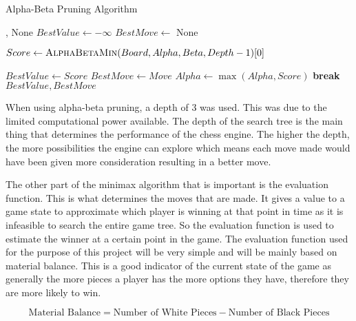 \begin{algorithm}[h]
    \caption{Alpha-Beta Pruning Algorithm}
    \begin{algorithmic}
            \State \Return {}, None
        \EndIf
        \State $BestValue \gets -\infty$
        \State $BestMove \gets$ None

            \State {}
            \State $Score \gets \textsc{AlphaBetaMin}(Board, Alpha, Beta, Depth - 1)[0]$
            
                \State $BestValue \gets Score$
                \State $BestMove \gets Move$
                \State $Alpha \gets \max(Alpha, Score)$
            \EndIf
                \State \textbf{break}
            \EndIf
        \EndFor
        \State \Return $BestValue, BestMove$
        \EndFunction
    \end{algorithmic}
\end{algorithm}

When using alpha-beta pruning, a depth of 3 was used. This was due to the limited computational power available. The depth of the search tree is the main thing that determines the performance of the chess engine. The higher the depth, the more possibilities the engine can explore which means each move made would have been given more consideration resulting in a better move.

The other part of the minimax algorithm that is important is the evaluation function. This is what determines the moves that are made. It gives a value to a game state to approximate which player is winning at that point in time as it is infeasible to search the entire game tree. So the evaluation function is used to estimate the winner at a certain point in the game. The evaluation function used for the purpose of this project will be very simple and will be mainly based on material balance. This is a good indicator of the current state of the game as generally the more pieces a player has the more options they have, therefore they are more likely to win.

\begin{equation}
    \label{eq:material}
    \text{Material Balance} = \text{Number of White Pieces} - \text{Number of Black Pieces} 
\end{equation}


